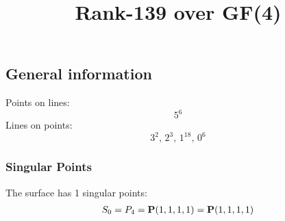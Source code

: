 \documentclass{article}
\newcommand\setTBstruts{\def\T{\rule{0pt}{2.6ex}}%
\def\B{\rule[-1.2ex]{0pt}{0pt}}}
\newcommand{\bP}{{\bf P}}
\begin{document}
 
\setTBstruts



{\allowdisplaybreaks%






\title{Rank-139 over GF(4)}
\author{}%
\maketitle%
%
{}



\subsection*{General information}
Points on lines:
$$
5^6$$
Lines on points:
$$
3^2,\,2^3,\,1^{18},\,0^6$$
\subsubsection*{Singular Points}
The surface has 1 singular points:\\
\begin{align*}
S_{0} &= P_{4}=\bP(1, 1, 1, 1) = \bP(1, 1, 1, 1)\\
\end{align*}
}
\end{document}
